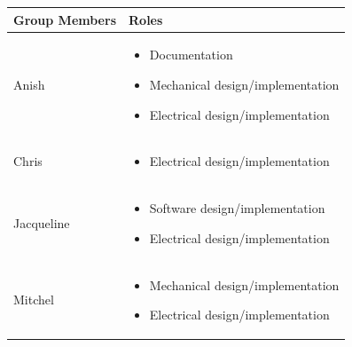 \documentclass[a4]{article}
\begin{document}
\begin{table}[h!]
\centering
\begin{tabularx}{\linewidth}{|Y|Y|}
\hline
\textcolor{McMasterMaroon}{\textbf{Group Members}} & 
\textcolor{McMasterMaroon}{\textbf{Roles}} \\
\hline
Anish &
\begin{minipage}[c]{\linewidth} %
\vspace{2mm}
\begin{itemize}[leftmargin=*, labelsep=3pt]
    \item Documentation
    \item Mechanical design/implementation
    \item Electrical design/implementation
\end{itemize}
\vspace{2mm}
\end{minipage} \\
\hline

Chris &
\begin{minipage}[c]{\linewidth} %
\vspace{2mm}
\begin{itemize}[leftmargin=*, labelsep=3pt]
    \item Electrical design/implementation
\end{itemize}
\vspace{2mm}
\end{minipage} \\
\hline

Jacqueline &
\begin{minipage}[c]{\linewidth} %
\vspace{2mm}
\begin{itemize}[leftmargin=*, labelsep=3pt]
    \item Software design/implementation
    \item Electrical design/implementation
\end{itemize}
\vspace{2mm}
\end{minipage} \\
\hline

Mitchel &
\begin{minipage}[c]{\linewidth} %
\vspace{2mm}
\begin{itemize}[leftmargin=*, labelsep=3pt]
    \item Mechanical design/implementation
    \item Electrical design/implementation
\end{itemize}
\vspace{2mm}
\end{minipage} \\
\hline


\end{tabularx}
\end{table}
\end{document}
